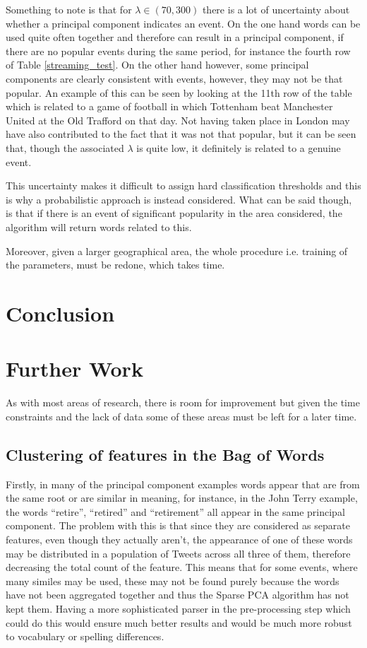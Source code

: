 \documentclass[11pt,a4paper]{article}
\begin{document}
Something to note is that for $\lambda \in (70, 300) $ there is a lot of uncertainty about whether a principal component indicates an event. On the one hand words can be used quite often together and therefore can result in a principal component, if there are no popular events during the same period, for instance the fourth row of Table \ref{streaming_test}. On the other hand however, some principal components are clearly consistent with events, however, they may not be that popular. An example of this can be seen by looking at the 11th row of the table which is related to a game of football in which Tottenham beat Manchester United at the Old Trafford on that day. Not having taken place in London may have also contributed to the fact that it was not that popular, but it can be seen that, though the associated $\lambda$ is quite low, it definitely is related to a genuine event. 

This uncertainty makes it difficult to assign hard classification thresholds and this is why a probabilistic approach is instead considered. What can be said though, is that if there is an event of significant popularity in the area considered, the algorithm will return words related to this.

Moreover, given a larger geographical area, the whole procedure i.e. training of the parameters, must be redone, which takes time. 


\clearpage
\section{Conclusion}
\section{Further Work}

As with most areas of research, there is room for improvement but given the time constraints and the lack of data some of these areas must be left for a later time. 

\subsection{Clustering of features in the Bag of Words}
Firstly, in many of the principal component examples words appear that are from the same root or are similar in meaning, for instance, in the John Terry example, the words ``retire'', ``retired'' and ``retirement'' all appear in the same principal component. The problem with this is that since they are considered as separate features, even though they actually aren't, the appearance of one of these words may be distributed in a population of Tweets across all three of them, therefore decreasing the total count of the feature. This means that for some events, where many similes may be used, these may not be found purely because the words have not been aggregated together and thus the Sparse PCA algorithm has not kept them. Having a more sophisticated parser in the pre-processing step which could do this would ensure much better results and would be much more robust to vocabulary or spelling differences.
\end{document}
